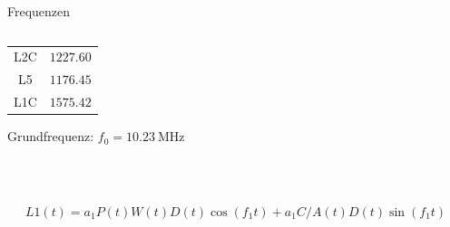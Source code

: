 \begin{frame}{Frequenzen}
\begin{columns}
\begin{column}{0.5\textwidth}
\begin{table}
\begin{tabular}{c c}
                    L2C     & $\num{1227.60}$ \\
                    L5      & $\num{1176.45}$ \\
                    L1C     & $\num{1575.42}$ \\
                    \bottomrule
                \end{tabular}
            \end{table}
            Grundfrequenz: $f_0 = \SI{10.23}{\mega\hertz}$
        \end{column}
    \end{columns}
    ~\\~\\
    \begin{equation}
        L1(t) = a_1P(t)W(t)D(t)\cos(f_1t)+a_1C/A(t)D(t)\sin(f_1t)
    \end{equation}
\end{frame}

